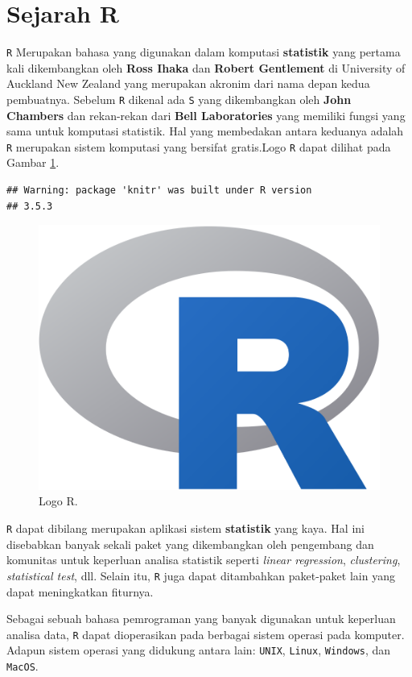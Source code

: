 \documentclass[]{book}
\begin{document}
\section{Sejarah R}\label{sejarah-r}

\texttt{R} Merupakan bahasa yang digunakan dalam komputasi
\textbf{statistik} yang pertama kali dikembangkan oleh \textbf{Ross
Ihaka} dan \textbf{Robert Gentlement} di University of Auckland New
Zealand yang merupakan akronim dari nama depan kedua pembuatnya. Sebelum
\texttt{R} dikenal ada \texttt{S} yang dikembangkan oleh \textbf{John
Chambers} dan rekan-rekan dari \textbf{Bell Laboratories} yang memiliki
fungsi yang sama untuk komputasi statistik. Hal yang membedakan antara
keduanya adalah \texttt{R} merupakan sistem komputasi yang bersifat
gratis.Logo \texttt{R} dapat dilihat pada Gambar \ref{fig:Logo}.

\begin{verbatim}
## Warning: package 'knitr' was built under R version
## 3.5.3
\end{verbatim}

\begin{figure}

{\centering \includegraphics[width=0.4\linewidth]{r-icon} 

}

\caption{Logo R.}\label{fig:Logo}
\end{figure}

\texttt{R} dapat dibilang merupakan aplikasi sistem \textbf{statistik}
yang kaya. Hal ini disebabkan banyak sekali paket yang dikembangkan oleh
pengembang dan komunitas untuk keperluan analisa statistik seperti
\emph{linear regression}, \emph{clustering}, \emph{statistical test},
dll. Selain itu, \texttt{R} juga dapat ditambahkan paket-paket lain yang
dapat meningkatkan fiturnya.

Sebagai sebuah bahasa pemrograman yang banyak digunakan untuk keperluan
analisa data, \texttt{R} dapat dioperasikan pada berbagai sistem operasi
pada komputer. Adapun sistem operasi yang didukung antara lain:
\texttt{UNIX}, \texttt{Linux}, \texttt{Windows}, dan \texttt{MacOS}.
\end{document}
